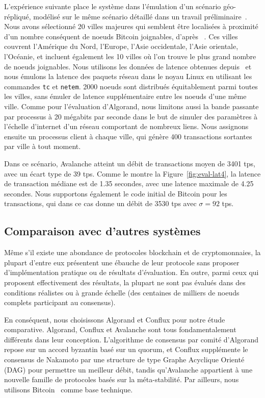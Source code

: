 L'expérience suivante place le système dans l'émulation d'un scénario géo-répliqué, modélisé sur le même scénario
détaillé dans un travail préliminaire~\cite{GiladHMVZ17}.
Nous avons sélectionné 20 villes majeures qui semblent être localisées à proximité d'un nombre conséquent de noeuds
Bitcoin joignables, d'après ~\cite{bitnodes2018}. Ces villes couvrent l'Amérique du Nord, l'Europe, l'Asie occidentale,
l'Asie orientale, l'Océanie, et incluent également les 10 villes où l'on trouve le plus grand nombre de noeuds
joignables. Nous utilisons les données de latence obtenues depuis~\cite{wondernetworkping2018} et nous émulons
la latence des paquets réseau dans le noyau Linux en utilisant les commandes \texttt{tc} et \texttt{netem}.
2000 noeuds sont distribués équitablement parmi toutes les villes, sans émuler de latence supplémentaire entre les
noeuds d'une même ville. Comme pour l'évaluation d'Algorand, nous limitons aussi la bande passante par processus
à 20 mégabits par seconde dans le but de simuler des paramètres à l'échelle d'internet d'un réseau comportant de
nombreux liens. Nous assignons ensuite un processus client à chaque ville, qui génère 400 transactions sortantes
par ville à tout moment.

Dans ce scénario, Avalanche atteint un débit de transactions moyen de 3401 tps, avec un écart type de 39 tps. Comme
le montre la Figure~\ref{fig:eval-lat4}, la latence de transaction médiane est de 1.35 secondes, avec une latence
maximale de 4.25 secondes. Nous supportons également le code initial de Bitcoin pour les transactions, qui dans ce
cas donne un débit de 3530 tps avec $\sigma = 92$ tps.

\subsection{Comparaison avec d'autres systèmes}

Même s'il existe une abondance de protocoles blockchain et de cryptomonnaies, la plupart d'entre eux présentent
une ébauche de leur protocole sans proposer d'implémentation pratique ou de résultats d'évaluation. En outre, parmi
ceux qui proposent effectivement des résultats, la plupart ne sont pas évalués dans des conditions réalistes ou à
grande échelle (des centaines de milliers de noeuds complets participant au consensus).

En conséquent, nous choisissons Algorand et Conflux pour notre étude comparative. Algorand, Conflux et Avalanche
sont tous fondamentalement différents dans leur conception. L'algorithme de consensus par comité
d'Algorand repose sur un accord byzantin basé sur un quorum, et Conflux supplémente le consensus de Nakamoto par une
structure de type Graphe Acyclique Orienté (DAG) pour permettre un meilleur débit, tandis qu'Avalanche appartient à
une nouvelle famille de protocoles basés sur la méta-stabilité. Par ailleurs, nous utilisons
Bitcoin~\cite{nakamoto2008bitcoin} comme base technique.

